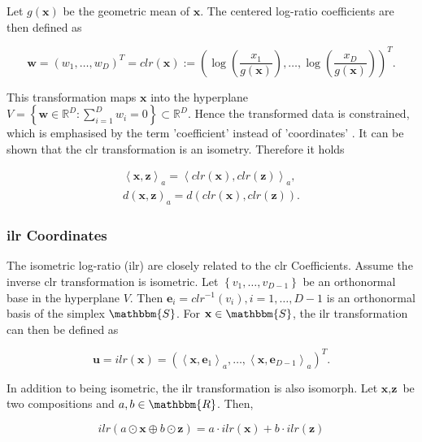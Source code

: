 Let $g(\textbf{x})$ be the geometric mean of $\textbf{x}$. The centered log-ratio coefficients are then defined as 

\begin{equation*}
\textbf{w} = (w_1,\ldots, w_D)^T = clr(\textbf{x}) := \left(\log\left(\frac{x_1}{g(\textbf{x})}\right),\ldots, \log\left(\frac{x_D}{g(\textbf{x})}\right)\right)^T .
\label{eq:clr Coefficients}
\end{equation*}

This transformation maps $\textbf{x}$ into the hyperplane $V = \left\{\textbf{w} \in \mathbb{R}^D: \sum_{i=1}^D w_i=0\right\} \subset \mathbb{R}^D$. Hence the transformed data is constrained, which is emphasised by the term 'coefficient' instead of 'coordinates' \cite{Filzmoser:2020}. It can be shown that the clr transformation is an isometry\cite{Egozcue:2003}. Therefore it holds 

\begin{gather*}
\left\langle  \textbf{x},\textbf{z} \right\rangle_a = \left\langle  clr(\textbf{x}),clr(\textbf{z}) \right\rangle_a, \\
d(\textbf{x},\textbf{z})_a = d(clr(\textbf{x}),clr(\textbf{z})) .
\label{eq:clr Coefficients isometric}
\end{gather*}

\subsubsection{ilr Coordinates}
\label{sec:ilr Coordinates}

The isometric log-ratio (ilr) are closely related to the clr Coefficients. Assume the inverse clr transformation is isometric. Let $\left\{v_1,\ldots,v_{D-1}\right\}$ be an orthonormal base in the hyperplane $V$. Then $\textbf{e}_i = clr^{-1}(v_i), i=1,\ldots,D-1$ is an orthonormal basis of the simplex $\mathbbm{S}$. For $\textbf{x} \in \mathbbm{S}$, the ilr transformation can then be defined as  

\begin{equation*}
\textbf{u} = ilr(\textbf{x}) = \left(\left\langle \textbf{x},\textbf{e}_1\right\rangle_a,\ldots,\left\langle \textbf{x},\textbf{e}_{D-1}\right\rangle_a\right)^T .
\label{eq:ilr Coordinates}
\end{equation*}

In addition to being isometric, the ilr transformation is also isomorph. Let $\textbf{x}, \textbf{z}$ be two compositions and $a, b  \in \mathbbm{R}$. Then,

\begin{equation*}
ilr(a \odot \textbf{x} \oplus b \odot \textbf{z}) = a \cdot ilr(\textbf{x}) + b \cdot ilr(\textbf{z})
\label{eq:ilr coordinates isomorph}
\end{equation*}

